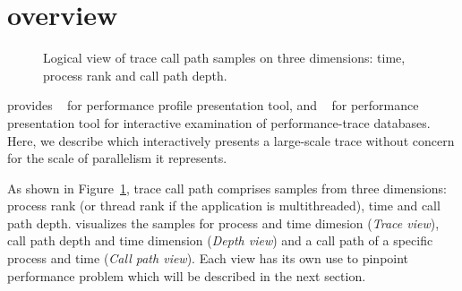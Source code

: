 


\newcommand{\traceview}{Trace view}
\newcommand{\depthview}{Depth view}
\newcommand{\miniview}{Mini map view}
\newcommand{\callview}{Call path view}



\section{\hpctraceviewer{} overview}

\begin{figure}[t]
\caption{Logical view of trace call path samples on three dimensions: time, process rank and call path depth.}
\label{fig:hpctraceviewer-callpath}
\end{figure}

\HPCToolkit{} provides \hpcviewer{}~\cite{Adhianto-MC-Ta:2010:PSTI-hpcviewer} for performance profile presentation tool, and \hpctraceviewer{}~\cite{Tallent-MC-etal:2011:hpctoolkit-scalable-tracing} for performance presentation tool for interactive examination of performance-trace databases.
Here, we describe \hpctraceviewer{} which interactively presents a large-scale trace without concern for the scale of parallelism it represents.

As shown in Figure~\ref{fig:hpctraceviewer-callpath}, trace call path comprises samples from three dimensions: process rank (or thread rank if the application is multithreaded), time and call path depth.
\hpctraceviewer{} visualizes the samples for process and time dimesion (\emph{\traceview}), call path depth and time dimension (\emph{\depthview}) and a call path of a specific process and time (\emph{\callview}).
Each view has its own use to pinpoint performance problem which will be described in the next section.

